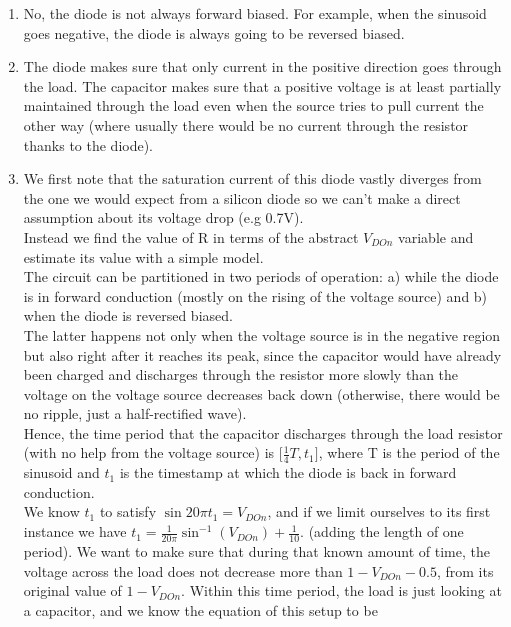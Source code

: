 \documentclass{article}
\begin{document}
\begin{prob}
	\begin{enumerate}
		\item No, the diode is not always forward biased. For example, when the sinusoid goes negative, the diode is always going to be reversed biased.

		\item The diode makes sure that only current in the positive direction goes through the load.
			The capacitor makes sure that a positive voltage is at least partially maintained through the load even when the source tries to pull current the other way (where usually there would be no current through the resistor thanks to the diode).

	\item We first note that the saturation current of this diode vastly diverges from the one we would expect from a silicon diode so we can't make a direct assumption about its voltage drop (e.g 0.7V). \\
		Instead we find the value of R in terms of the abstract $V_{DOn}$ variable and estimate its value with a simple model. \\
		The circuit can be partitioned in two periods of operation: a) while the diode is in forward conduction (mostly on the rising of the voltage source) and b) when the diode is reversed biased. \\
		The latter happens not only when the voltage source is in the negative region but also right after it reaches its peak, since the capacitor would have already been charged and discharges through the resistor more slowly than the voltage on the voltage source decreases back down (otherwise, there would be no ripple, just a half-rectified wave). \\
		Hence, the time period that the capacitor discharges through the load resistor (with no help from the voltage source) is [$\frac{1}{4}T, t_1]$, where T is the period of the sinusoid and $t_1$ is the timestamp at which the diode is back in forward conduction. \\
		We know $t_1$ to satisfy  $\sin{20\pi t_1}=V_{DOn}$, and if we limit ourselves to its  first instance we have  $t_1=\frac{1}{20\pi}\sin ^{-1}(V_{DOn})+\frac{1}{10}$. (adding the length of one period).
		We want to make sure that during that known amount of time, the voltage across the load does not decrease more than $1-V_{DOn}-0.5$, from its original value of $1-V_{DOn}$.
		Within this time period, the load is just looking at a capacitor, and we know the equation of this setup to be

\end{enumerate}
\end{prob}
\end{document}
